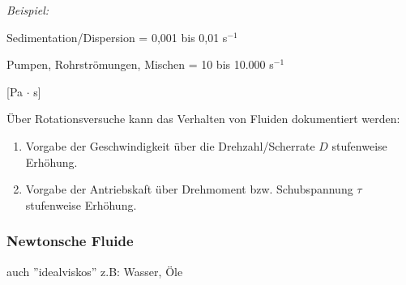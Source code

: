 \documentclass[a4paper,10pt,twoside]{article}
\begin{document}
\textit{Beispiel:} \par 
Sedimentation/Dispersion = 0,001 bis 0,01 s$^{-1}$ \par 
Pumpen, Rohrströmungen, Mischen = 10 bis 10.000 s$^{-1}$



\pp

 \par 
[Pa $\cdot$ s]


Über Rotationsversuche kann das Verhalten von Fluiden dokumentiert werden:
\begin{enumerate}
\item Vorgabe der Geschwindigkeit über die Drehzahl/Scherrate $D$ \RA stufenweise Erhöhung.
\item Vorgabe der Antriebskaft über Drehmoment bzw. Schubspannung $\tau$ \RA stufenweise Erhöhung.
\end{enumerate}
\pp

\subsubsection{Newtonsche Fluide}
auch ''idealviskos'' \RA z.B: Wasser, Öle \pp
{}
\end{document}
